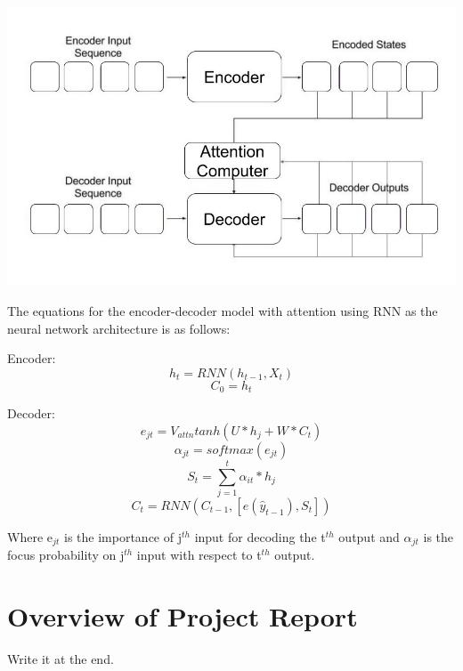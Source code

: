 				\begin{center}
				\includegraphics[width=\linewidth]{figures/Attention-Model.jpg}	
				\label{fig: Encoder - Decoder Mechanism with Attention}
				\end{center}

The equations for the encoder-decoder model with attention using RNN as the neural network architecture is as follows:

Encoder: \begin{equation} h_{t} = RNN(h_{t-1}, X_{t}) \end{equation}
		\begin{equation} C_{0} = h_{t}  \end{equation}

Decoder: \begin{equation} e_{jt} = V_{attn} tanh(U * h_{j} + W * C_{t}) \end{equation}	
		 \begin{equation} \alpha_{jt} = softmax(e_{jt})  \end{equation}
		 \begin{equation} S_{t} = \sum_{j=1}^t\alpha_{it} * h_{j}  \end{equation}  
		 \begin{equation} C_{t} = RNN(C_{t-1}, [e(\hat{y}_{t-1}), S_{t}])  \end{equation} 

Where e$_{jt}$ is the importance of j$^{th}$ input for decoding the t$^{th}$ output and $\alpha$$_{jt}$ is the focus probability on j$^{th}$ input with respect to t$^{th}$ output.
	


\section{Overview of Project Report}

Write it at the end.